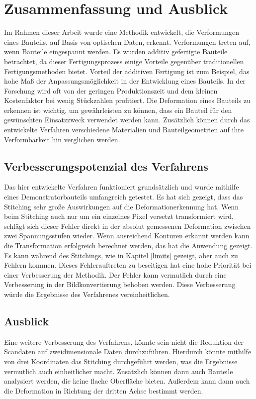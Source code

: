 
\chapter{Zusammenfassung und Ausblick}

Im Rahmen dieser Arbeit wurde eine Methodik entwickelt, die 
Verformungen eines Bauteils, auf Basis von optischen Daten, erkennt. 
Verformungen treten auf, wenn Bauteile eingespannt werden.
Es wurden additiv gefertigte Bauteile 
betrachtet, da dieser Fertigungsprozess einige Vorteile gegenüber
traditionellen Fertigungsmethoden bietet. 
Vorteil der additiven Fertigung ist zum Beispiel, das hohe Maß der 
Anpassungsmöglichkeit in der Entwicklung eines Bauteils. In der Forschung 
wird oft von der geringen Produktionszeit und dem kleinen Kostenfaktor 
bei wenig Stückzahlen profitiert. Die Deformation eines Bauteils zu 
erkennen ist wichtig, um gewährleisten zu können, dass ein Bauteil für 
den gewünschten Einsatzzweck verwendet werden kann. Zusätzlich können 
durch das entwickelte Verfahren verschiedene Materialien und Bauteilgeometrien 
auf ihre Verformbarkeit hin verglichen werden.

\section{Verbesserungspotenzial des Verfahrens}

Das hier entwickelte Verfahren funktioniert grundsätzlich und wurde mithilfe 
eines Demonstratorbauteils umfangreich getestet. Es hat sich gezeigt, dass 
das Stitching sehr große Auswirkungen auf die Deformationerkennung hat. 
Wenn beim Stitching auch nur um ein einzelnes Pixel versetzt transformiert wird,
schlägt sich dieser Fehler direkt in der absolut gemessenen 
Deformation zwischen zwei Spannungsstufen wieder.
Wenn ausreichend Konturen erkannt werden kann die Transformation erfolgreich
berechnet werden, das hat die Anwendung gezeigt. Es kann während des Stitchings, wie in Kapitel 
\ref{limits} gezeigt, aber auch zu Fehlern kommen. 
Dieses Fehlerauftreten zu beseitigen hat eine hohe Priorität 
bei einer Verbesserung der Methodik. 
Der Fehler kann vermutlich durch eine Verbesserung in der Bildkonvertierung
behoben werden. Diese Verbesserung würde die Ergebnisse 
des Verfahrenes vereinheitlichen.

\section{Ausblick}

Eine weitere Verbesserung des Verfahrens, könnte sein nicht die Reduktion der 
Scandaten auf zweidimensionale Daten durchzuführen. 
Hierdurch könnte mithilfe von drei Koordinaten das Stitching durchgeführt werden, 
was die Ergebnisse vermutlich auch einheitlicher macht. Zusätzlich können 
dann auch Bauteile analysiert werden, die keine flache Oberfläche bieten.
Außerdem kann dann auch die Deformation in Richtung der dritten Achse bestimmt werden. 

